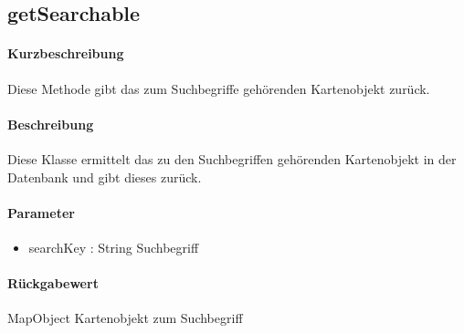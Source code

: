 \subsection{getSearchable}%
\paragraph*{Kurzbeschreibung}
Diese Methode gibt das zum Suchbegriffe gehörenden Kartenobjekt zurück.
\paragraph*{Beschreibung}
Diese Klasse ermittelt das zu den Suchbegriffen gehörenden Kartenobjekt in der Datenbank und gibt dieses zurück.
\paragraph*{Parameter}
\begin{itemize}
    \item searchKey : String Suchbegriff
\end{itemize}
\paragraph*{Rückgabewert}
MapObject Kartenobjekt zum Suchbegriff